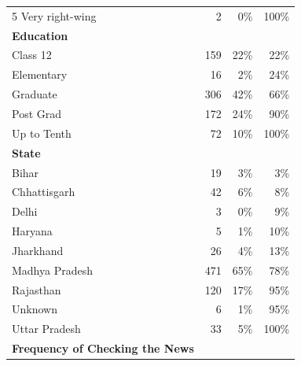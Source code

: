 \documentclass[empirical, authordate, issue]{jote-new-article}
\begin{document}
\begin{table}
\begin{tabularx}{\linewidth}{@{} X  r  r r@{}}
    5 Very right-wing                       & 2        & 0\%               & 100\%                        \\
    \textbf{Education}                      &          &                   &                              \\
    Class 12                                & 159      & 22\%              & 22\%                         \\
    Elementary                              & 16       & 2\%               & 24\%                         \\
    Graduate                                & 306      & 42\%              & 66\%                         \\
    Post Grad                               & 172      & 24\%              & 90\%                         \\
    Up to Tenth                             & 72       & 10\%              & 100\%                        \\
    \textbf{State}                          &          &                   &                              \\
    Bihar                                   & 19       & 3\%               & 3\%                          \\
    Chhattisgarh                            & 42       & 6\%               & 8\%                          \\
    Delhi                                   & 3        & 0\%               & 9\%                          \\
    Haryana                                 & 5        & 1\%               & 10\%                         \\
    Jharkhand                               & 26       & 4\%               & 13\%                         \\
    Madhya Pradesh                          & 471      & 65\%              & 78\%                         \\
    Rajasthan                               & 120      & 17\%              & 95\%                         \\
    Unknown                                 & 6        & 1\%               & 95\%                         \\
    Uttar Pradesh                           & 33       & 5\%               & 100\%                        \\
    \textbf{Frequency of Checking the News} &          &                   &                              \\

\end{tabularx}
\end{table}
\end{document}
